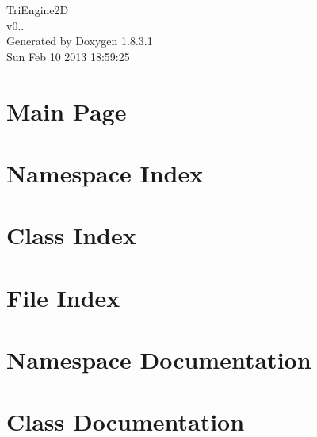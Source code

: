 \documentclass{book}
\begin{document}
\hypersetup{pageanchor=false,citecolor=blue}
\begin{titlepage}
\vspace*{7cm}
\begin{center}
{\Large Tri\-Engine2\-D \\[1ex]\large v0.. }\\
\vspace*{1cm}
{\large Generated by Doxygen 1.8.3.1}\\
\vspace*{0.5cm}
{\small Sun Feb 10 2013 18:59:25}\\
\end{center}
\end{titlepage}
\clearemptydoublepage
{}
\tableofcontents
\clearemptydoublepage
{}
\hypersetup{pageanchor=true,citecolor=blue}
\chapter{Main Page}
\label{index}\hypertarget{index}{}
\chapter{Namespace Index}

\chapter{Class Index}

\chapter{File Index}

\chapter{Namespace Documentation}







\chapter{Class Documentation}









\end{document}
